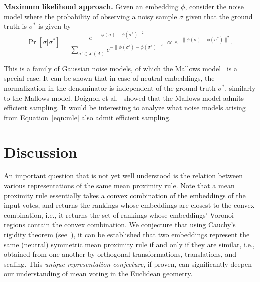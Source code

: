 \documentclass[prodmode,acmec]{ec-acmsmall}
\newcommand{\calL}{{\mathcal{L}}}
\newcommand{\rank}{{\calL(A)}}
\begin{document}
\medskip
\noindent \textbf{Maximum likelihood approach.} Given an embedding $\phi$, consider the noise model where the probability of observing a noisy sample $\sigma$ given that the ground truth is $\sigma^*$ is given by 
\begin{equation}
\Pr[\sigma | \sigma^*] = \frac{e^{-\|\phi(\sigma)-\phi(\sigma^*)\|^2}}{\sum_{\sigma' \in \rank} e^{-\|\phi(\sigma')-\phi(\sigma^*)\|^2}} \propto e^{-\|\phi(\sigma)-\phi(\sigma^*)\|^2}.
\label{eqn:mle}
\end{equation}

This is a family of Gaussian noise models, of which the Mallows model~\cite{Mall57} is a special case. It can be shown that in case of neutral embeddings, the normalization in the denominator is independent of the ground truth $\sigma^*$, similarly to the Mallows model. Doignon et al.~ showed that the Mallows model admits efficient sampling. It would be interesting to analyze what noise models arising from Equation~\eqref{eqn:mle} also admit efficient sampling. 


\section{Discussion}
\label{sec:disc}

An important question that is not yet well understood is the relation between various representations of the same mean proximity rule. Note that a mean proximity rule essentially takes a convex combination of the embeddings of the input votes, and returns the rankings whose embeddings are closest to the convex combination, i.e., it returns the set of rankings whose embeddings' Voronoi regions contain the convex combination. We conjecture that using Cauchy's rigidity theorem (see~\cite{aigner2010cauchy}), it can be established that two embeddings represent the same (neutral) symmetric mean proximity rule if and only if they are similar, i.e., obtained from one another by orthogonal transformations, translations, and scaling. This \emph{unique representation conjecture}, if proven, can significantly deepen our understanding of mean voting in the Euclidean geometry. 
\end{document}
